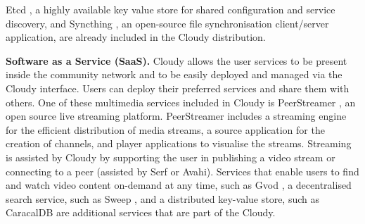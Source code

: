 Etcd \cite{Etcd}, a highly available key value store for shared configuration and service discovery, and Syncthing \cite{Syncthing}, an open-source file synchronisation client/server application, are already included in the Cloudy distribution.

\textbf{Software as a Service (SaaS).}
Cloudy allows the user services to be present inside the community network and to be easily deployed and managed via the Cloudy interface. Users can deploy their preferred services and share them with others. One of these multimedia services included in Cloudy is PeerStreamer \cite{PeerStreamer}, an open source live streaming platform. PeerStreamer includes a streaming engine for the efficient distribution of media streams, a source application for the creation of channels, and player applications to visualise the streams. 
Streaming is assisted by Cloudy by supporting the user in publishing a video stream or connecting to a peer (assisted by Serf or Avahi). 
Services that enable users to find and watch video content on-demand at any time, such as Gvod \cite{gvod}, 
a decentralised search service, such as Sweep \cite{Sweep},
and a distributed key-value store, such as CaracalDB \cite{CaracalDB} 
are additional services that are part of the Cloudy.
